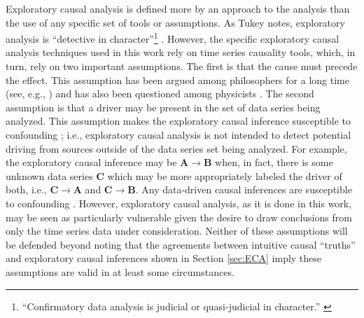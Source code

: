 Exploratory causal analysis is defined more by an approach to the analysis than the use of any specific set of tools or assumptions.  As Tukey notes, exploratory analysis is ``detective in character''\footnote{``Confirmatory data analysis is judicial or quasi-judicial in character.'' \cite{Tukey1977}} \cite{Tukey1977}.  However, the specific exploratory causal analysis techniques used in this work rely on time series causality tools, which, in turn, rely on two important assumptions.  The first is that the cause must precede the effect.  This assumption has been argued among philosophers for a long time (see, e.g., \cite{Russell1912,Russell1948,Salmon1984,Reichenbach2001,Illari2014,Pearl2000}) and has also been questioned among physicists \cite{Bohm1971,Bunge1979}.  The second assumption is that a driver may be present in the set of data series being analyzed.  This assumption makes the exploratory causal inference susceptible to confounding \cite{Illari2014,Pearl2000}; i.e., exploratory causal analysis is not intended to detect potential driving from sources outside of the data series set being analyzed.  For example, the exploratory causal inference may be $\mathbf{A}\rightarrow\mathbf{B}$ when, in fact, there is some unknown data series $\mathbf{C}$ which may be more appropriately labeled the driver of both, i.e., $\mathbf{C}\rightarrow\mathbf{A}$ and $\mathbf{C}\rightarrow\mathbf{B}$.  Any data-driven causal inferences are susceptible to confounding \cite{Illari2014}.  However, exploratory causal analysis, as it is done in this work, may be seen as particularly vulnerable given the desire to draw conclusions from only the time series data under consideration.  Neither of these assumptions will be defended beyond noting that the agreements between intuitive causal ``truths'' and exploratory causal inferences shown in Section \ref{sec:ECA} imply these assumptions are valid in at least some circumstances.

